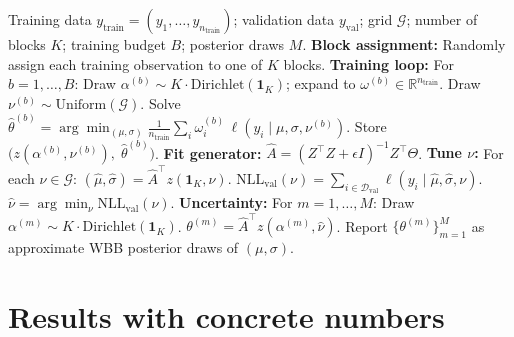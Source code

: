 \documentclass[12pt]{article}
\begin{document}
\begin{algorithm}[H]
\caption{Generative WBB for Student-$t$ degree-of-freedom selection}
\begin{algorithmic}[1]
\Require Training data $y_{\mathrm{train}} = (y_1,\ldots,y_{n_{\mathrm{train}}})$; validation data $y_{\mathrm{val}}$; grid $\mathcal{G}$; number of blocks $K$; training budget $B$; posterior draws $M$.
\Statex
\State \textbf{Block assignment:} Randomly assign each training observation to one of $K$ blocks.
\Statex
\State \textbf{Training loop:} For $b = 1,\ldots,B$:
\State \hspace{1em} Draw $\alpha^{(b)} \sim K \cdot \mathrm{Dirichlet}(\mathbf{1}_K)$; expand to $\omega^{(b)} \in \mathbb{R}^{n_{\mathrm{train}}}$.
\State \hspace{1em} Draw $\nu^{(b)} \sim \mathrm{Uniform}(\mathcal{G})$.
\State \hspace{1em} Solve $\hat\theta^{(b)} = \arg\min_{(\mu,\sigma)} \frac{1}{n_{\mathrm{train}}}\sum_i \omega_i^{(b)}\,\ell(y_i\mid\mu,\sigma,\nu^{(b)})$.
\State \hspace{1em} Store $\bigl(z(\alpha^{(b)},\nu^{(b)}),\;\hat\theta^{(b)}\bigr)$.
\Statex
\State \textbf{Fit generator:} $\hat A = (Z^\top Z + \epsilon I)^{-1} Z^\top \Theta$.
\Statex
\State \textbf{Tune $\nu$:} For each $\nu \in \mathcal{G}$:
\State \hspace{1em} $(\hat\mu,\hat\sigma) = \hat A^\top z(\mathbf{1}_K,\nu)$.
\State \hspace{1em} $\mathrm{NLL}_{\mathrm{val}}(\nu) = \sum_{i\in\mathcal{D}_{\mathrm{val}}} \ell(y_i\mid\hat\mu,\hat\sigma,\nu)$.
\State $\hat\nu = \arg\min_\nu \mathrm{NLL}_{\mathrm{val}}(\nu)$.
\Statex
\State \textbf{Uncertainty:} For $m = 1,\ldots,M$:
\State \hspace{1em} Draw $\alpha^{(m)} \sim K \cdot \mathrm{Dirichlet}(\mathbf{1}_K)$.
\State \hspace{1em} $\theta^{(m)} = \hat A^\top z(\alpha^{(m)},\hat\nu)$.
\State Report $\bigl\{\theta^{(m)}\bigr\}_{m=1}^M$ as approximate WBB posterior draws of $(\mu,\sigma)$.
\end{algorithmic}
\end{algorithm}

\section{Results with concrete numbers}
\end{document}

